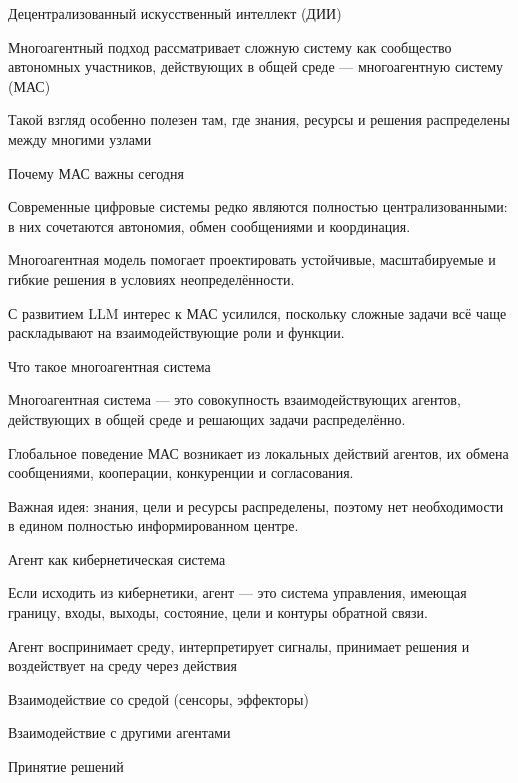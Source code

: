 \begin{frame}{Децентрализованный искусственный интеллект (ДИИ)}
	\topline
	\justifying
	\begin{textitemize}
		\item Многоагентный подход рассматривает сложную систему как сообщество автономных участников, действующих в общей среде --- многоагентную систему (МАС)
		\item Такой взгляд особенно полезен там, где знания, ресурсы и решения распределены между многими узлами
	\end{textitemize}
\end{frame}

\begin{frame}{Почему МАС важны сегодня}
	\topline
	\justifying
	\begin{textitemize}
		\item Современные цифровые системы редко являются полностью централизованными: в них сочетаются автономия, обмен сообщениями и координация.
		\item Многоагентная модель помогает проектировать устойчивые, масштабируемые и гибкие решения в условиях неопределённости.
		\item С развитием LLM интерес к МАС усилился, поскольку сложные задачи всё чаще раскладывают на взаимодействующие роли и функции.
	\end{textitemize}
\end{frame}

\begin{frame}{Что такое многоагентная система}
	\topline
	\justifying
	\begin{textitemize}
		\item Многоагентная система --- это совокупность взаимодействующих агентов, действующих в общей среде и решающих задачи распределённо.
		\item Глобальное поведение МАС возникает из локальных действий агентов, их обмена сообщениями, кооперации, конкуренции и согласования.
		\item Важная идея: знания, цели и ресурсы распределены, поэтому нет необходимости в едином полностью информированном центре.
	\end{textitemize}
\end{frame}

\begin{frame}{Агент как кибернетическая система}
	\topline
	\justifying
	\begin{textitemize}
		\item Если исходить из кибернетики, агент --- это система управления, имеющая границу, входы, выходы, состояние, цели и контуры обратной связи.
		\item Агент воспринимает среду, интерпретирует сигналы, принимает решения и воздействует на среду через действия
		\begin{textitemize}
			\item Взаимодействие со средой (сенсоры, эффекторы)
			\item Взаимодействие с другими агентами
			\item Принятие решений
		\end{textitemize}
	\end{textitemize}
\end{frame}

